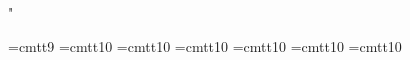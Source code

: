 \restorecat"
\def\cal{\fam2}

%
 \font\ttix=cmtt9
 \font\ttx=cmtt10 \font\ttxi=cmtt10 \sc@led \magstephalf
 \font\ttxii=cmtt10 \sc@led {}
 \font\ttxiv=cmtt10 \sc@led {}
 \font\ttxvii=cmtt10 \sc@led {}
 \font\ttxx=cmtt10 \sc@led {}

\def\tt{\Typeface:ComputerModern \Style:typewriter }
\def\terugstreep{{\tt \char`\\}}

%
\def\DefineTypeface#1#2#3#4{\csarg\def{#1@code}{#2}
    \csarg\def{#1@styles}{#3 }
    \csarg\def{#1@sizes}{#4 }
    \if\NextChar[%
        {\DefineTypeface@combos{#1}}{\DefineTypeface@combos{#1}[]}}
\def\DefineTypeface@combos#1[#2]{\csarg\def{#1@combos}{#2}}

\def\style@selector{\mswitch \xp\if\xp\EqualStringX\xp{\F@style} in: }
\def\a@style@selector#1{\mswitch \xp\if\xp\EqualStringX\xp{#1} in: }
\def\size@selector{\fswitch {\ifnum\Fsize} in: }
\def\a@size@selector#1{\fswitch {\ifnum#1} in: }

\def\ext@combo{\csname\F@name @combos\endcsname}
\def\ext@style{\xp\xp\xp\style@selector
               \csname\F@name @styles\endcsname\endswitch}
\def\ext@size {\xp\xp\xp\size@selector
               \csname\F@name @sizes\endcsname\endswitch}
\def\ext@name{\csname\F@name @code\endcsname}

\endinput

